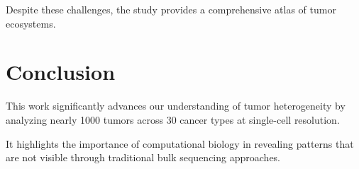 \documentclass[12pt]{article}
\begin{document}
Despite these challenges, the study provides a comprehensive atlas of tumor ecosystems.

\section{Conclusion}

This work significantly advances our understanding of tumor heterogeneity by analyzing nearly 1000 tumors across 30 cancer types at single-cell resolution.

It highlights the importance of computational biology in revealing patterns that are not visible through traditional bulk sequencing approaches.



\end{document}
